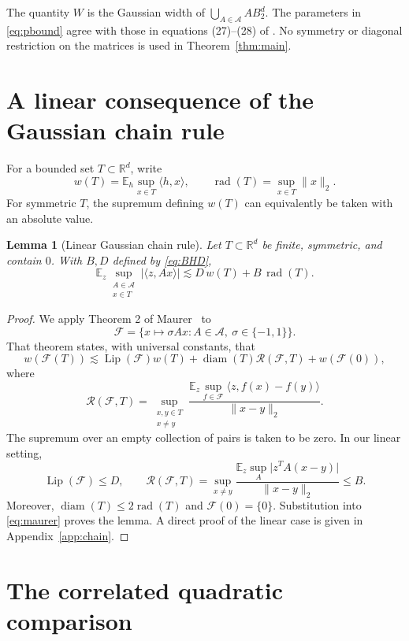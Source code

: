 \documentclass[11pt,a4paper]{article}
\numberwithin{equation}{section}
\newtheorem{lemma}[theorem]{Lemma}
\theoremstyle{remark}
\newcommand{\E}{\mathbb E}
\newcommand{\R}{\mathbb R}
\newcommand{\cA}{\mathcal A}
\newcommand{\cF}{\mathcal F}
\newcommand{\norm}[1]{\lVert #1\rVert}
\newcommand{\abs}[1]{\lvert #1\rvert}
\newcommand{\ip}[2]{\langle #1,#2\rangle}
\newcommand{\rad}{\operatorname{rad}}
\newcommand{\diam}{\operatorname{diam}}
\newcommand{\Lip}{\operatorname{Lip}}
\begin{document}
The quantity $W$ is the Gaussian width of $\bigcup_{A\in\cA}AB_2^d$. The parameters in \eqref{eq:pbound} agree with those in equations (27)--(28) of \cite{ALM}. No symmetry or diagonal restriction on the matrices is used in Theorem~\ref{thm:main}.

\section{A linear consequence of the Gaussian chain rule}

For a bounded set $T\subset\R^d$, write
\[
 w(T)=\E_h\sup_{x\in T}\ip{h}{x},
 \qquad \rad(T)=\sup_{x\in T}\norm{x}_2.
\]
For symmetric $T$, the supremum defining $w(T)$ can equivalently be taken with an absolute value.

\begin{lemma}[Linear Gaussian chain rule]\label{lem:chain}
Let $T\subset\R^d$ be finite, symmetric, and contain $0$. With $B,D$ defined by \eqref{eq:BHD},
\begin{equation}
 \E_z\sup_{\substack{A\in\cA\\x\in T}}\abs{\ip{z}{Ax}}
 \lesssim D\,w(T)+B\,\rad(T).
 \label{eq:linear-chain}
\end{equation}
\end{lemma}

\begin{proof}
We apply Theorem 2 of Maurer~\cite{Maurer} to
\[
 \cF=\{x\mapsto \sigma Ax:A\in\cA,\ \sigma\in\{-1,1\}\}.
\]
That theorem states, with universal constants, that
\begin{equation}
 w(\cF(T))\lesssim
 \Lip(\cF)w(T)+\diam(T)\mathcal R(\cF,T)+w(\cF(0)),
 \label{eq:maurer}
\end{equation}
where
\[
 \mathcal R(\cF,T)=
 \sup_{\substack{x,y\in T\\x\ne y}}
 \frac{\E_z\sup_{f\in\cF}\ip{z}{f(x)-f(y)}}{\norm{x-y}_2}.
\]
The supremum over an empty collection of pairs is taken to be zero. In our linear setting,
\[
 \Lip(\cF)\le D,
 \qquad
 \mathcal R(\cF,T)
 =\sup_{x\ne y}\frac{\E_z\sup_A\abs{z^TA(x-y)}}{\norm{x-y}_2}
 \le B.
\]
Moreover, $\diam(T)\le2\rad(T)$ and $\cF(0)=\{0\}$. Substitution into \eqref{eq:maurer} proves the lemma. A direct proof of the linear case is given in Appendix~\ref{app:chain}.
\end{proof}

\section{The correlated quadratic comparison}
\end{document}
